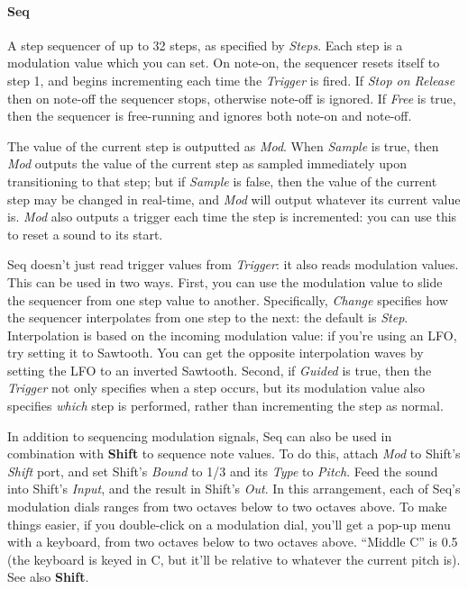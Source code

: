 \documentclass{article}
\begin{document}
\paragraph{Seq}  A step sequencer of up to 32 steps, as specified by {\it Steps}.  Each step is a modulation value which you can set.  On note-on, the sequencer resets itself to step 1, and begins incrementing each time the {\it Trigger} is fired.   If {\it Stop on Release} then on note-off the sequencer stops, otherwise note-off is ignored.  If {\it Free} is true, then the sequencer is free-running and ignores both note-on and note-off.    

The value of the current step is outputted as {\it Mod}.  When {\it Sample} is true, then {\it Mod} outputs the value of the current step as sampled immediately upon transitioning to that step; but if {\it Sample} is false, then the value of the current step may be changed in real-time, and {\it Mod} will output whatever its current value is.  {\it Mod} also outputs a trigger each time the step is incremented: you can use this to reset a sound to its start. 

Seq doesn't just read trigger values from {\it Trigger}: it also reads modulation values.  This can be used in two ways.  First, you can use the modulation value to slide the sequencer from one step value to another.  Specifically, {\it Change} specifies how the sequencer interpolates from one step to the next: the default is {\it Step}.  Interpolation is based on the incoming modulation value: if you're using an LFO, try setting it to Sawtooth.  You can get the opposite interpolation waves by setting the LFO to an inverted Sawtooth.   Second, if {\it Guided} is true, then the {\it Trigger} not only specifies when a step occurs, but its modulation value also specifies {\it which} step is performed, rather than incrementing the step as normal.

In addition to sequencing modulation signals, Seq can also be used in combination with {\bf Shift} to sequence note values.  To do this, attach {\it Mod} to Shift's {\it Shift} port, and set Shift's {\it Bound} to 1/3 and its {\it Type} to {\it Pitch}.  Feed the sound into Shift's {\it Input}, and the result in Shift's {\it Out}.  In this arrangement, each of Seq's modulation dials ranges from two octaves below to two octaves above.  To make things easier, if you double-click on a modulation dial, you'll get a pop-up menu with a keyboard, from two octaves below to two octaves above.  ``Middle C'' is 0.5 (the keyboard is keyed in C, but it'll be relative to whatever the current pitch is).  See also {\bf Shift}.
\end{document}
